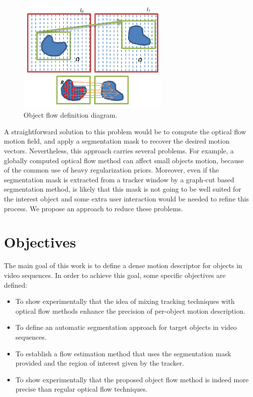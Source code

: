    \begin{figure}[bhp]
      \centering
      \includegraphics[width=0.66\textwidth]{../images/diagram.png}
      \caption{ Object flow definition diagram. }
      \label{diagram}
   \end{figure}

A straightforward solution to this problem would be to compute the optical flow motion field, and apply 
a segmentation mask to recover the desired motion vectors. Nevertheless, this approach carries several 
problems. For example, a globally computed optical flow method can affect small objects motion, because of 
the common use of heavy regularization priors. Moreover, even if the segmentation mask is extracted from a 
tracker window by a graph-cut based segmentation method, is likely that this mask is not going to be well suited for the 
interest object and some extra user interaction would be needed to refine this process. We propose an approach 
to reduce these problems.

\section{Objectives}

The main goal of this work is to define a dense motion descriptor for objects in video sequences. 
In order to achieve this goal, some specific objectives are defined:

\begin{itemize}

  \item To show experimentally that the idea of mixing tracking techniques with optical flow methods enhance the precision of per-object motion description.
  \item To define an automatic segmentation approach for target objects in video sequences.
  \item To establish a flow estimation method that uses the segmentation mask provided and the region of interest given by the tracker.
  \item To show experimentally that the proposed object flow method is indeed more precise than regular optical flow techniques.

\end{itemize}


